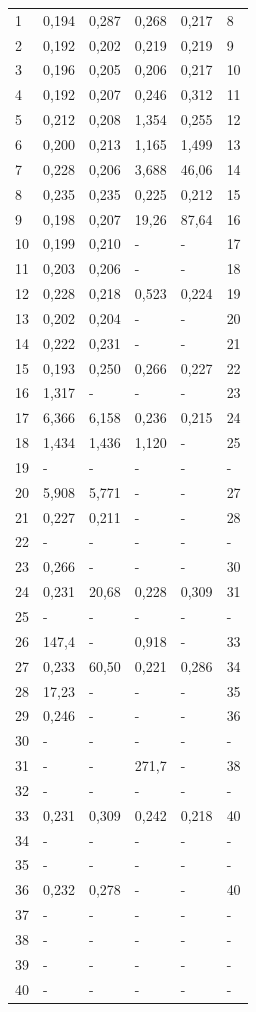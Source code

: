 \begin{center}
\begin{longtable}{|l|l|l|l|l|l|}
1 & 0,194 & 0,287 & 0,268 & 0,217 & 8 \\
2 & 0,192 & 0,202 & 0,219 & 0,219 & 9 \\
3 & 0,196 & 0,205 & 0,206 & 0,217 & 10 \\
4 & 0,192 & 0,207 & 0,246 & 0,312 & 11 \\
5 & 0,212 & 0,208 & 1,354 & 0,255 & 12 \\
6 & 0,200 & 0,213 & 1,165 & 1,499 & 13 \\
7 & 0,228 & 0,206 & 3,688 & 46,06 & 14 \\
8 & 0,235 & 0,235 & 0,225 & 0,212 & 15 \\
9 & 0,198 & 0,207 & 19,26 & 87,64 & 16 \\
10 & 0,199 & 0,210 & - & - & 17 \\
11 & 0,203 & 0,206 & - & - & 18 \\
12 & 0,228 & 0,218 & 0,523 & 0,224 & 19 \\
13 & 0,202 & 0,204 & - & - & 20 \\
14 & 0,222 & 0,231 & - & - & 21 \\
15 & 0,193 & 0,250 & 0,266 & 0,227 & 22 \\
16 & 1,317 & - & - & - & 23 \\
17 & 6,366 & 6,158 & 0,236 & 0,215 & 24 \\
18 & 1,434 & 1,436 & 1,120  & - & 25 \\
19 & - & - & - & - & - \\
20 & 5,908 & 5,771 & - & - & 27 \\
21 & 0,227 & 0,211 & - & - & 28 \\
22 & - & - & - & - & - \\
23 & 0,266 & - & - & - & 30 \\
24 & 0,231 & 20,68 & 0,228 & 0,309 & 31 \\
25 & - & - & - & - & - \\
26 & 147,4 & - & 0,918 & - & 33 \\
27 & 0,233 & 60,50 & 0,221 & 0,286 & 34 \\
28 & 17,23 & - & - & - & 35 \\
29 & 0,246 & - & - & - & 36 \\
30 & - & - & - & - & - \\
31 & - & - & 271,7 & - & 38 \\
32 & - & - & - & - & - \\
33 & 0,231 & 0,309 & 0,242 & 0,218 & 40 \\
34 & - & - & - & - & - \\
35 & - & - & - & - & - \\
36 & 0,232 & 0,278 & - & - & 40 \\
37 & - & - & - & - & - \\
38 & - & - & - & - & - \\
39 & - & - & - & - & - \\
40 & - & - & - & - & - \\
\end{longtable}
\end{center}


\newpage